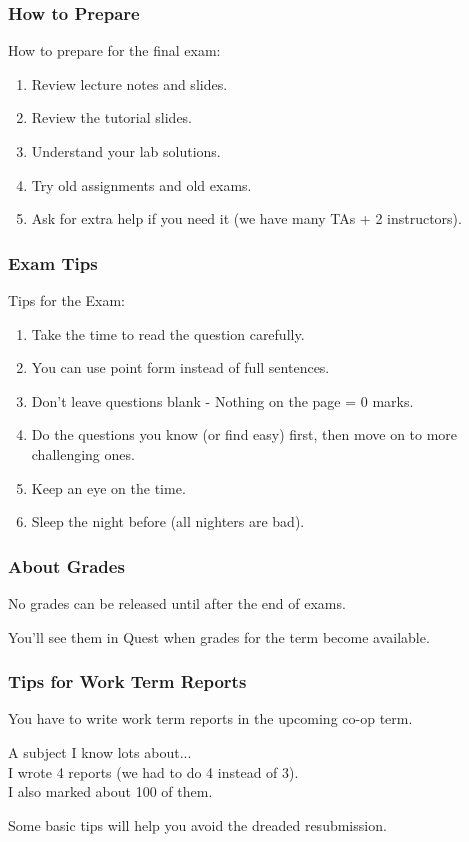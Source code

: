 \begin{frame}
\frametitle{How to Prepare}

How to prepare for the final exam:

\begin{enumerate}
	\item Review lecture notes and slides.
	\item Review the tutorial slides.
	\item Understand your lab solutions.
	\item Try old assignments and old exams.
	\item Ask for extra help if you need it (we have many TAs + 2 instructors).
\end{enumerate}

\end{frame}

\begin{frame}
\frametitle{Exam Tips}

Tips for the Exam:

\begin{enumerate}
	\item Take the time to read the question carefully.
	\item You can use point form instead of full sentences.
	\item Don't leave questions blank - Nothing on the page = 0 marks.
	\item Do the questions you know (or find easy) first, then move on to more challenging ones.
	\item Keep an eye on the time.
	\item Sleep the night before (all nighters are bad).
	
\end{enumerate}

\end{frame}


\begin{frame}
\frametitle{About Grades}

No grades can be released until after the end of exams.

You'll see them in Quest when grades for the term become available.


\end{frame}

\begin{frame}
\frametitle{Tips for Work Term Reports}

You have to write work term reports in the upcoming co-op term.

A subject I know lots about...\\
\quad I wrote 4 reports (we had to do 4 instead of 3).\\
\quad I also marked about 100 of them.

Some basic tips will help you avoid the dreaded resubmission.

\end{frame}


